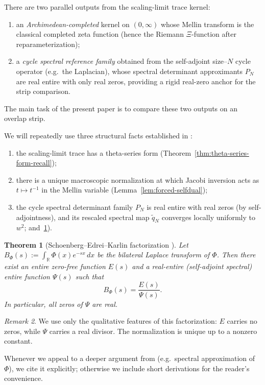 \documentclass[11pt]{amsart}
\newtheorem{theorem}{Theorem}[section]
\theoremstyle{definition}
\theoremstyle{remark}
\newtheorem{remark}[theorem]{Remark}
\newcommand{\R}{\mathbb{R}}
\begin{document}
There are two parallel outputs from the scaling-limit trace kernel:
\begin{enumerate}[label=(\roman*)]
\item an \emph{Archimedean-completed} kernel on $(0,\infty)$ whose Mellin transform is the classical
completed zeta function (hence the Riemann $\Xi$-function after reparameterization);
\item a \emph{cycle spectral reference family} obtained from the self-adjoint size--$N$ cycle operator (e.g.\ the Laplacian), whose spectral determinant approximants $P_N$ are real entire with only real zeros,
providing a rigid real-zero anchor for the strip comparison.
\end{enumerate}
The main task of the present paper is to compare these two outputs on an overlap strip.

We will repeatedly use three structural facts established in \cite{PaperI}:
\begin{enumerate}
\item the scaling-limit trace has a theta-series form (Theorem~\ref{thm:theta-series-form-recall});
\item there is a unique macroscopic normalization at which Jacobi inversion acts as
$t\mapsto t^{-1}$ in the Mellin variable (Lemma~\ref{lem:forced-selfdual});
\item the cycle spectral determinant family $P_N$ is real entire with real zeros (by self-adjointness), and its rescaled spectral map $\widetilde q_N$ converges locally uniformly to $w^2$;
and~\ref{thm:SEK}).
\end{enumerate}

\begin{theorem}[Schoenberg--Edrei--Karlin factorization {\cite[Theorem~5.4]{PaperI}}]\label{thm:SEK}
Let $B_\Phi(s):=\int_{\R}\Phi(x)e^{-sx}\,dx$ be the bilateral Laplace transform of $\Phi$. Then there exist an entire zero-free function $E(s)$ and a real-entire (self-adjoint spectral) entire function $\Psi(s)$ such that
\[
B_\Phi(s)=\frac{E(s)}{\Psi(s)}.
\]
In particular, all zeros of $\Psi$ are real.
\end{theorem}

\begin{remark}
We use only the qualitative features of this factorization: $E$ carries no zeros, while $\Psi$ carries a real divisor. The normalization is unique up to a nonzero constant.
\end{remark}

Whenever we appeal to a deeper argument from \cite{PaperI} (e.g.\ spectral approximation of $\Phi$),
we cite it explicitly; otherwise we include short derivations for the reader's convenience.
\end{document}
